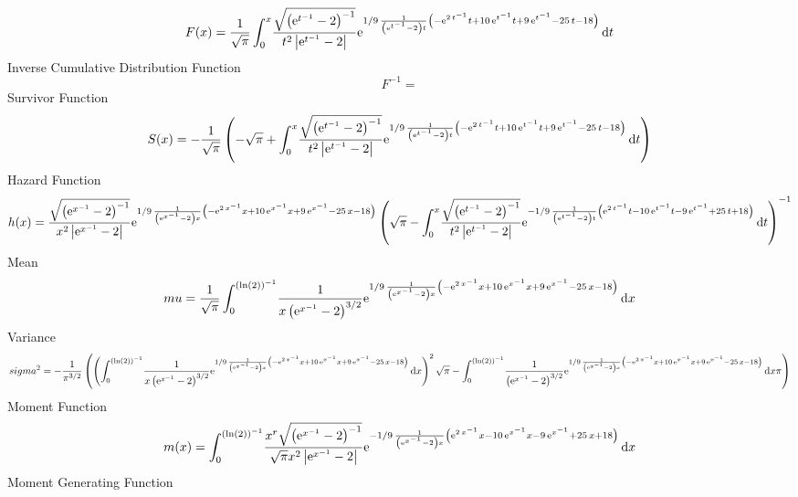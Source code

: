 \documentclass[12pt]{article}
\begin{document}
 $$F(x)={\frac {1}{\sqrt {\pi}}\int_{0}^{x}\!{\frac {\sqrt { \left( {{\rm e}^{
{t}^{-1}}}-2 \right) ^{-1}}}{{t}^{2} \left| {{\rm e}^{{t}^{-1}}}-2
 \right| }{{\rm e}^{1/9\,{\frac {1}{ \left( {{\rm e}^{{t}^{-1}}}-2
 \right) t} \left( -{{\rm e}^{2\,{t}^{-1}}}t+10\,{{\rm e}^{{t}^{-1}}}t
+9\,{{\rm e}^{{t}^{-1}}}-25\,t-18 \right) }}}}\,{\rm d}t}
$$ Inverse Cumulative Distribution Function 
  $$F^{-1} = $$Survivor Function 
 $$ S(x)=-{\frac {1}{\sqrt {\pi}} \left( -\sqrt {\pi}+\int_{0}^{x}\!{\frac {
\sqrt { \left( {{\rm e}^{{t}^{-1}}}-2 \right) ^{-1}}}{{t}^{2} \left| {
{\rm e}^{{t}^{-1}}}-2 \right| }{{\rm e}^{1/9\,{\frac {1}{ \left( {
{\rm e}^{{t}^{-1}}}-2 \right) t} \left( -{{\rm e}^{2\,{t}^{-1}}}t+10\,
{{\rm e}^{{t}^{-1}}}t+9\,{{\rm e}^{{t}^{-1}}}-25\,t-18 \right) }}}}
\,{\rm d}t \right) }
$$ Hazard Function 
 $$ h(x)={\frac {\sqrt { \left( {{\rm e}^{{x}^{-1}}}-2 \right) ^{-1}}}{{x}^{2}
 \left| {{\rm e}^{{x}^{-1}}}-2 \right| }{{\rm e}^{1/9\,{\frac {1}{
 \left( {{\rm e}^{{x}^{-1}}}-2 \right) x} \left( -{{\rm e}^{2\,{x}^{-1
}}}x+10\,{{\rm e}^{{x}^{-1}}}x+9\,{{\rm e}^{{x}^{-1}}}-25\,x-18
 \right) }}} \left( \sqrt {\pi}-\int_{0}^{x}\!{\frac {\sqrt { \left( {
{\rm e}^{{t}^{-1}}}-2 \right) ^{-1}}}{{t}^{2} \left| {{\rm e}^{{t}^{-1
}}}-2 \right| }{{\rm e}^{-1/9\,{\frac {1}{ \left( {{\rm e}^{{t}^{-1}}}
-2 \right) t} \left( {{\rm e}^{2\,{t}^{-1}}}t-10\,{{\rm e}^{{t}^{-1}}}
t-9\,{{\rm e}^{{t}^{-1}}}+25\,t+18 \right) }}}}\,{\rm d}t \right) ^{-1
}}
$$Mean 
 $$ mu={\frac {1}{\sqrt {\pi}}\int_{0}^{ \left( \ln  \left( 2 \right) 
 \right) ^{-1}}\!{\frac {1}{x \left( {{\rm e}^{{x}^{-1}}}-2 \right) ^{
3/2}}{{\rm e}^{1/9\,{\frac {1}{ \left( {{\rm e}^{{x}^{-1}}}-2 \right) 
x} \left( -{{\rm e}^{2\,{x}^{-1}}}x+10\,{{\rm e}^{{x}^{-1}}}x+9\,{
{\rm e}^{{x}^{-1}}}-25\,x-18 \right) }}}}\,{\rm d}x}
$$ Variance 
 $$ sigma^2 = -{\frac {1}{{\pi}^{3/2}} \left(  \left( \int_{0}^{ \left( \ln  \left( 
2 \right)  \right) ^{-1}}\!{\frac {1}{x \left( {{\rm e}^{{x}^{-1}}}-2
 \right) ^{3/2}}{{\rm e}^{1/9\,{\frac {1}{ \left( {{\rm e}^{{x}^{-1}}}
-2 \right) x} \left( -{{\rm e}^{2\,{x}^{-1}}}x+10\,{{\rm e}^{{x}^{-1}}
}x+9\,{{\rm e}^{{x}^{-1}}}-25\,x-18 \right) }}}}\,{\rm d}x \right) ^{2
}\sqrt {\pi}-\int_{0}^{ \left( \ln  \left( 2 \right)  \right) ^{-1}}\!
{\frac {1}{ \left( {{\rm e}^{{x}^{-1}}}-2 \right) ^{3/2}}{{\rm e}^{1/9
\,{\frac {1}{ \left( {{\rm e}^{{x}^{-1}}}-2 \right) x} \left( -{
{\rm e}^{2\,{x}^{-1}}}x+10\,{{\rm e}^{{x}^{-1}}}x+9\,{{\rm e}^{{x}^{-1
}}}-25\,x-18 \right) }}}}\,{\rm d}x\pi \right) }
$$Moment Function 
 $$ m(x) = \int_{0}^{ \left( \ln  \left( 2 \right)  \right) ^{-1}}\!{\frac {{x}^{
r}\sqrt { \left( {{\rm e}^{{x}^{-1}}}-2 \right) ^{-1}}}{\sqrt {\pi}{x}
^{2} \left| {{\rm e}^{{x}^{-1}}}-2 \right| }{{\rm e}^{-1/9\,{\frac {1
}{ \left( {{\rm e}^{{x}^{-1}}}-2 \right) x} \left( {{\rm e}^{2\,{x}^{-
1}}}x-10\,{{\rm e}^{{x}^{-1}}}x-9\,{{\rm e}^{{x}^{-1}}}+25\,x+18
 \right) }}}}\,{\rm d}x
$$ Moment Generating Function 
\end{document}
